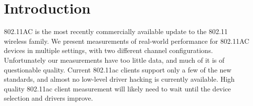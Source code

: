 \section{Introduction}
802.11AC is the most recently commercially available update to the
802.11 wireless family. We present measurements of real-world
performance for 802.11AC devices in multiple settings, with two
different channel configurations. Unfortunately our measurements have
too little data, and much of it is of questionable quality. Current
802.11ac clients support only a few of the new standards, and almost
no low-level driver hacking is currently available. High quality
802.11ac client measurement will likely need to wait until the device
selection and drivers improve.
